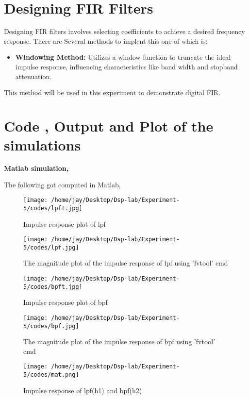 \documentclass[journal,12pt,onecolumn]{IEEEtran}
\theoremstyle{remark}
\begin{document}
\section{Designing FIR Filters}
Designing FIR filters involves selecting coefficients to achieve a desired frequency response. There are Several methods to implent this one of which is:
\begin{itemize}
\item \textbf{Windowing Method:} Utilizes a window function to truncate the ideal impulse response, influencing characteristics like band width and stopband attenuation.
\end{itemize}
This method will be used in this experiment to demonstrate digital FIR.
\section{Code , Output and Plot of the simulations}
\textbf{Matlab simulation,}

The following got computed in  Matlab,\\
\begin{figure}[ht] %
  \centering
  \texttt{[image: /home/jay/Desktop/Dsp-lab/Experiment-5/codes/lpft.jpg]}
  \label{fig:your_label}
  \caption{Impulse response plot of lpf}
\end{figure}
\begin{figure}[ht] %
  \centering
  \texttt{[image: /home/jay/Desktop/Dsp-lab/Experiment-5/codes/lpf.jpg]}
  \caption{The magnitude plot of the impulse response of lpf using 'fvtool' cmd}
  \label{fig:your_label}
\end{figure}
\begin{figure}[ht] %
  \centering
  \texttt{[image: /home/jay/Desktop/Dsp-lab/Experiment-5/codes/bpft.jpg]}
  \caption{Impulse response plot of bpf}
  \label{fig:your_label}
\end{figure}
\begin{figure}[ht] %
  \centering
  \texttt{[image: /home/jay/Desktop/Dsp-lab/Experiment-5/codes/bpf.jpg]}
  \caption{The magnitude plot of the impulse response of bpf using 'fvtool' cmd}
  \label{fig:your_label}
\end{figure}
\begin{figure}[ht] %
  \centering
  \texttt{[image: /home/jay/Desktop/Dsp-lab/Experiment-5/codes/mat.png]}
  \caption{Impulse response of lpf(h1) and bpf(h2)}
  \label{fig:your_label}
\end{figure}
\end{document}

